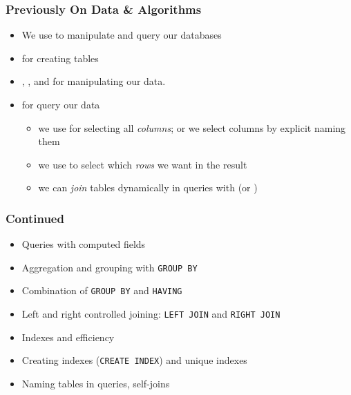 \documentclass[dvipsnames]{beamer}
\subtitle{SQL}
\begin{document}
\begin{frame}
  \titlepage{}
\end{frame}

\begin{frame}
  \frametitle{Previously On Data \& Algorithms}

\begin{itemize}
\item We use \intro{\sql} to manipulate and query our databases
\item {} for creating tables
\item {}, , and
   for manipulating our data.
\item {} for query our data
  \begin{itemize}
  \item we use \intro{\texttt{*}} for selecting all \emph{columns}; or we
    select columns by explicit naming them
  \item we use  to select which \emph{rows} we
    want in the result
  \item we can \emph{join} tables dynamically in queries with
    \intro{\texttt{,}} (or )
  \end{itemize}

\end{itemize}
\end{frame}



\begin{frame}
\frametitle{\sql{} Continued}

\begin{itemize}
\item Queries with computed fields
\item Aggregation and grouping with \texttt{GROUP BY}
\item Combination of \texttt{GROUP BY} and \texttt{HAVING}
\item Left and right controlled joining: \texttt{LEFT JOIN} and
  \texttt{RIGHT JOIN}
\item Indexes and efficiency
\item Creating indexes (\texttt{CREATE INDEX}) and unique indexes
\item Naming tables in queries, self-joins
\end{itemize}
\end{frame}
\end{document}
